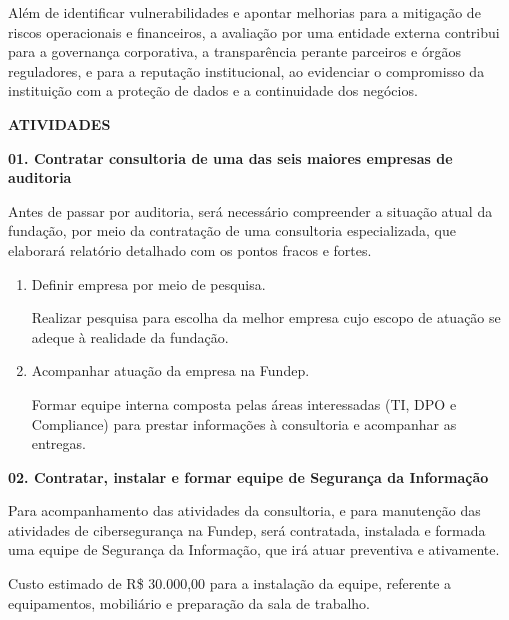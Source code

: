 \documentclass[12pt,a4paper]{article}
\newcommand{\secao}[1]{%
  \par\vspace{\dimexpr16pt-\parskip\relax}%
  {\noindent\bfseries\color{azulTitulo}\fontsize{13}{16}\selectfont #1}%
  \par\vspace{\dimexpr8pt-\parskip\relax}%
}
\newcommand{\atividade}[1]{%
  \par\vspace{\dimexpr16pt-\parskip\relax}%
  {\bfseries\color{azulAtividade}#1}%
  \par\vspace{\dimexpr8pt-\parskip\relax}%
}
\begin{document}
Além de identificar vulnerabilidades e apontar melhorias para a mitigação de riscos operacionais e financeiros, a avaliação por uma entidade externa contribui para a governança corporativa, a transparência perante parceiros e órgãos reguladores, e para a reputação institucional, ao evidenciar o compromisso da instituição com a proteção de dados e a continuidade dos negócios.

%
\secao{ATIVIDADES}

\atividade{01. Contratar consultoria de uma das seis maiores empresas de auditoria}

Antes de passar por auditoria, será necessário compreender a situação atual da fundação, por meio da contratação de uma consultoria especializada, que elaborará relatório detalhado com os pontos fracos e fortes.

\begin{enumerate}
  \item Definir empresa por meio de pesquisa.

        Realizar pesquisa para escolha da melhor empresa cujo escopo de atuação se adeque à realidade da fundação.
  \item Acompanhar atuação da empresa na Fundep.

        Formar equipe interna composta pelas áreas interessadas (TI, DPO e Compliance) para prestar informações à consultoria e acompanhar as entregas.
\end{enumerate}

\atividade{02. Contratar, instalar e formar equipe de Segurança da Informação}

Para acompanhamento das atividades da consultoria, e para manutenção das atividades de cibersegurança na Fundep, será contratada, instalada e formada uma equipe de Segurança da Informação, que irá atuar preventiva e ativamente.

Custo estimado de R\$ 30.000,00 para a instalação da equipe, referente a equipamentos, mobiliário e preparação da sala de trabalho.
\end{document}
